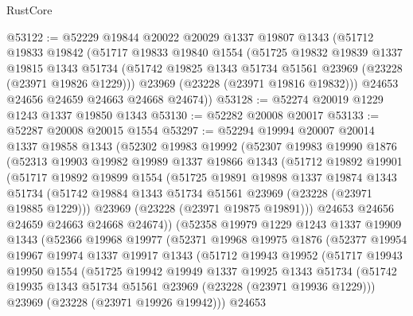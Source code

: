 \begin{lexlean}{RustCore}
\begin{coremodule}
@53122 := @52229
    @19844
    @20022
    @20029
    @1337
    @19807
    @1343
    (@51712
      @19833
      @19842
      (@51717
        @19833
        @19840
        @1554
        (@51725
          @19832
          @19839
          @1337
          @19815
          @1343
          @51734
          (@51742 @19825 @1343 @51734 @51561 @23969 (@23228 (@23971 @19826 @1229)))
          @23969
          (@23228 (@23971 @19816 @19832)))
        @24653
        @24656
        @24659
        @24663
        @24668
        @24674))
@53128 := @52274 @20019 @1229 @1243 @1337 @19850 @1343
@53130 := @52282 @20008 @20017
@53133 := @52287 @20008 @20015 @1554
@53297 := @52294
    @19994
    @20007
    @20014
    @1337
    @19858
    @1343
    (@52302
      @19983
      @19992
      (@52307
        @19983
        @19990
        @1876
        (@52313
          @19903
          @19982
          @19989
          @1337
          @19866
          @1343
          (@51712
            @19892
            @19901
            (@51717
              @19892
              @19899
              @1554
              (@51725
                @19891
                @19898
                @1337
                @19874
                @1343
                @51734
                (@51742 @19884 @1343 @51734 @51561 @23969 (@23228 (@23971 @19885 @1229)))
                @23969
                (@23228 (@23971 @19875 @19891)))
              @24653
              @24656
              @24659
              @24663
              @24668
              @24674))
          (@52358
            @19979
            @1229
            @1243
            @1337
            @19909
            @1343
            (@52366
              @19968
              @19977
              (@52371
                @19968
                @19975
                @1876
                (@52377
                  @19954
                  @19967
                  @19974
                  @1337
                  @19917
                  @1343
                  (@51712
                    @19943
                    @19952
                    (@51717
                      @19943
                      @19950
                      @1554
                      (@51725
                        @19942
                        @19949
                        @1337
                        @19925
                        @1343
                        @51734
                        (@51742 @19935 @1343 @51734 @51561 @23969 (@23228 (@23971 @19936 @1229)))
                        @23969
                        (@23228 (@23971 @19926 @19942)))
                      @24653

\end{coremodule}
\end{lexlean}
